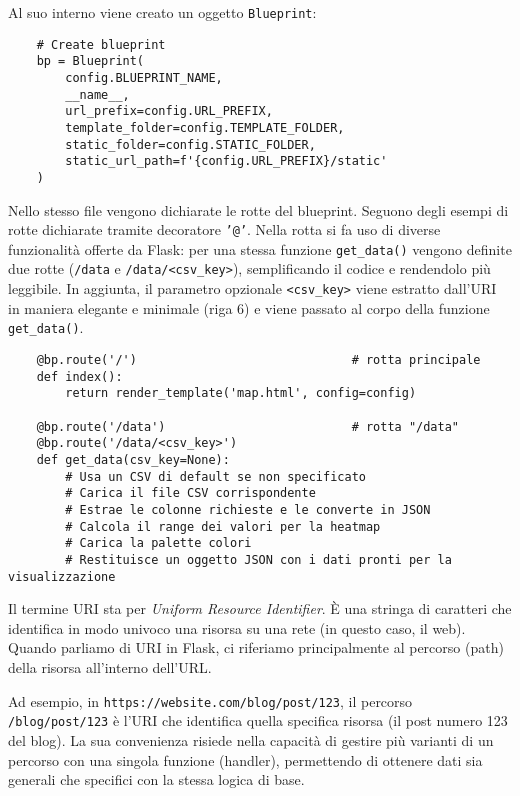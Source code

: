 Al suo interno viene creato un oggetto \texttt{Blueprint}:

\begin{listing}[H]
\label{lst:create_heatmap_blueprint}
\begin{verbatim}
    # Create blueprint
    bp = Blueprint(
        config.BLUEPRINT_NAME,
        __name__,
        url_prefix=config.URL_PREFIX,
        template_folder=config.TEMPLATE_FOLDER,
        static_folder=config.STATIC_FOLDER,
        static_url_path=f'{config.URL_PREFIX}/static'
    )
\end{verbatim}

Nello stesso file vengono dichiarate le rotte del blueprint. Seguono degli esempi di rotte dichiarate tramite decoratore \texttt{'@'}. Nella rotta  si fa uso di diverse funzionalità offerte da Flask: per una stessa funzione \texttt{get\_data()} vengono definite due rotte (\texttt{/data} e \texttt{/data/<csv\_key>}), semplificando il codice e rendendolo più leggibile. In aggiunta, il parametro opzionale \texttt{<csv\_key>} viene estratto dall'URI in maniera elegante e minimale (riga 6) e viene passato al corpo della funzione \texttt{get\_data()}.

\begin{verbatim}
    @bp.route('/')                              # rotta principale
    def index():
        return render_template('map.html', config=config)
        
    @bp.route('/data')                          # rotta "/data"
    @bp.route('/data/<csv_key>')
    def get_data(csv_key=None):
        # Usa un CSV di default se non specificato
        # Carica il file CSV corrispondente
        # Estrae le colonne richieste e le converte in JSON
        # Calcola il range dei valori per la heatmap
        # Carica la palette colori
        # Restituisce un oggetto JSON con i dati pronti per la visualizzazione

\end{verbatim}
\end{listing}

Il termine URI sta per \textit{Uniform Resource Identifier}. È una stringa di caratteri che identifica in modo univoco una risorsa su una rete (in questo caso, il web).
Quando parliamo di URI in Flask, ci riferiamo principalmente al percorso (path) della risorsa all'interno dell'URL. 

Ad esempio, in \texttt{https://website.com/blog/post/123}, il percorso \texttt{/blog/post/123} è l'URI che identifica quella specifica risorsa (il post numero 123 del blog).
La sua convenienza risiede nella capacità di gestire più varianti di un percorso con una singola funzione (handler), permettendo di ottenere dati sia generali che specifici con la stessa logica di base.

